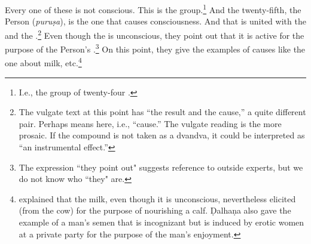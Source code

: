 \begin{translation}
Every one of these is not conscious.  This is the
group.\footnote{I.e., the group of twenty-four
    .}  And the twenty-fifth, the Person
    (\emph{puruṣa}), is the one that causes
    consciousness.  And that is united with the 
    and the .\footnote{The vulgate text at this point
        has ``the result and the cause,'' a quite different pair. Perhaps
         means  here, i.e., ``cause.'' The vulgate
        reading is the more prosaic.  If the compound  is not
        taken as a dvandva, it could be interpreted as ``an instrumental
        effect.''} %
        Even though the  is
        unconscious, they point out that it is active for the purpose
        of the Person's .\footnote{The
            expression ``they point out" suggests reference to outside
            experts, but we do not know who ``they" are.} %
            On this point, they give the examples of causes like the
            one about milk, etc.\footnote{
                explained that the milk, even though it is unconscious,
                nevertheless elicited (from the cow) for the purpose of
                nourishing a calf.   Ḍalhaṇa also gave the example of a
                man's semen that is incognizant but is induced by erotic
                women at a private party for the purpose of the man's
                enjoyment.}











\end{translation}
